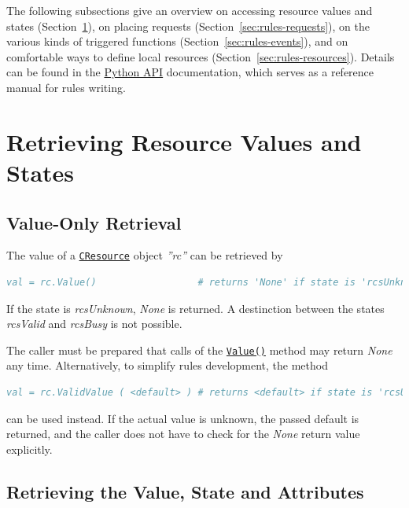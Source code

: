 \documentclass[12pt,english,parskip=half,headheight=19pt]{scrreprt}
\newcommand{\refdoc}[2]{\href{#1}{#2}}              %
\newcommand{\refapipython}[1]{\href{home2l-api_python/index.html}{\mbox{\texttt{#1}}}}  %
\newcommand{\theapipython}{\refdoc{home2l-api_python/index.html}{Python API}}
\begin{document}
The following subsections give an overview on accessing resource values and states (Section~\ref{sec:rules-values}), on placing requests (Section~\ref{sec:rules-requests}), on the various kinds of triggered functions (Section~\ref{sec:rules-events}), and on comfortable ways to define local resources (Section~\ref{sec:rules-resources}). Details can be found in the \theapipython{} documentation, which serves as a reference manual for rules writing.





\section{Retrieving Resource Values and States}
\label{sec:rules-values}



\subsection{Value-Only Retrieval}

The value of a \refapipython{CResource} object \textit{''rc''} can be retrieved by
\begin{lstlisting}[language=comments]
val = rc.Value()                  # returns 'None' if state is 'rcsUnknown'
\end{lstlisting}

If the state is \textit{rcsUnknown}, \textit{None} is returned. A destinction between the states \textit{rcsValid} and \textit{rcsBusy} is not possible.

The caller must be prepared that calls of the \refapipython{Value()} method may return \textit{None} any time.
Alternatively, to simplify rules development, the method
\begin{lstlisting}[language=comments]
val = rc.ValidValue ( <default> ) # returns <default> if state is 'rcsUnknown'
\end{lstlisting}
can be used instead. If the actual value is unknown, the passed default is returned, and the caller does not have to check for the \textit{None} return value explicitly.



\subsection{Retrieving the Value, State and Attributes}
\end{document}

